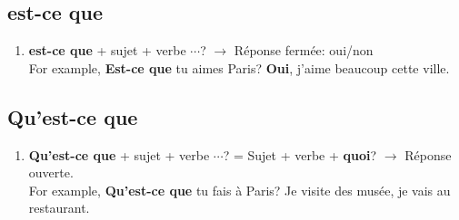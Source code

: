 \documentclass[10pt,a4paper,twoside]{article} %
\begin{document}
\subsection*{est-ce que}
\begin{enumerate}
    \item \textbf{est-ce que} + sujet + verbe $\cdots$? $\rightarrow$ Réponse fermée: oui/non \\
    For example, \textbf{Est-ce que} tu aimes Paris? \textbf{Oui}, j'aime beaucoup cette ville. \\
\end{enumerate}

\subsection*{Qu'est-ce que}
\begin{enumerate}
    \item \textbf{Qu'est-ce que} + sujet + verbe $\cdots$? = Sujet + verbe + \textbf{quoi}? $\rightarrow$ Réponse ouverte. \\
    For example, \textbf{Qu'est-ce que} tu fais à Paris? Je visite des musée, je vais au restaurant. \\
\end{enumerate}
\end{document}
